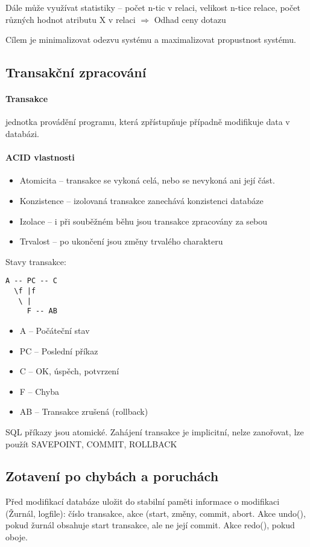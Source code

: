 \documentclass[a4paper, 11pt]{report}
\begin{document}
Dále může využívat statistiky -- počet n-tic v relaci, velikost n-tice relace, počet různých hodnot atributu X v relaci $\Rightarrow$ Odhad ceny dotazu

Cílem je minimalizovat odezvu systému a maximalizovat propustnost systému.

\subsection{Transakční zpracování}

\paragraph{Transakce} jednotka provádění programu, která zpřístupňuje případně modifikuje data v databázi.

\paragraph{ACID vlastnosti}
\begin{itemize}
	\item Atomicita -- transakce se vykoná celá, nebo se nevykoná ani její část.
	\item Konzistence -- izolovaná transakce zanechává konzistenci databáze
	\item Izolace -- i při souběžném běhu jsou transakce zpracovány za sebou
	\item Trvalost -- po ukončení jsou změny trvalého charakteru
\end{itemize}

Stavy transakce:
\begin{verbatim}
A -- PC -- C
  \f |f
   \ |
     F -- AB
\end{verbatim}
\begin{itemize}
	\item A -- Počáteční stav
	\item PC -- Poslední příkaz
	\item C -- OK, úspěch, potvrzení
	\item F -- Chyba
	\item AB -- Transakce zrušená (rollback)
\end{itemize}

SQL příkazy jsou atomické. Zahájení transakce je implicitní, nelze zanořovat, lze použít SAVEPOINT, COMMIT, ROLLBACK

\subsection{Zotavení po chybách a poruchách}
Před modifikací databáze uložit do stabilní paměti informace o modifikaci (Žurnál, logfile): číslo transakce, akce (start, změny, commit, abort. Akce undo(), pokud žurnál obsahuje start transakce, ale ne její commit. Akce redo(), pokud oboje.
\end{document}
